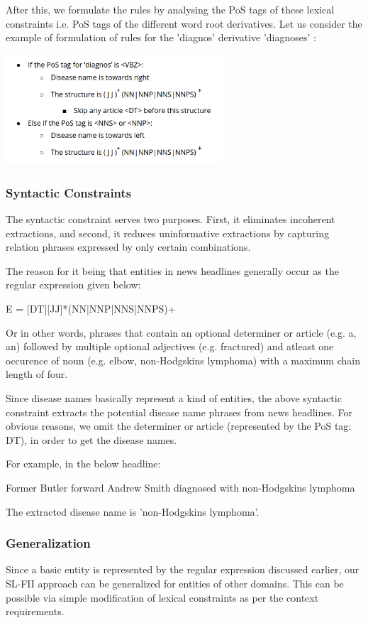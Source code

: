 \documentclass{article}
\begin{document}
After this, we formulate the rules by analysing the PoS tags of these lexical constraints i.e. PoS tags of the
different word root derivatives. Let us consider the example of formulation of rules for the
'diagnos' derivative 'diagnoses' :


\includegraphics[width=3.2in]{img/rules.png}

\subsubsection{Syntactic Constraints}

The syntactic constraint serves two purposes. First, it eliminates incoherent extractions, and second, it
reduces uninformative extractions by capturing relation phrases
expressed by only certain combinations. 

The reason for it being that entities in news headlines generally occur as the regular expression given below:

E = [DT][JJ]*(NN|NNP|NNS|NNPS)+

Or in other words, phrases that contain an optional determiner or article (e.g. a, an)  followed by multiple optional adjectives (e.g. fractured) and atleast one occurence of noun (e.g. elbow, non-Hodgskins lymphoma) with a maximum chain length of four. 
 
Since disease names basically represent a kind of entities, the above syntactic constraint extracts the potential disease name phrases from news headlines. For obvious reasons, we omit the determiner or article (represented by the PoS tag: DT), in order to get the disease names.

For example, in the below headline: 

Former Butler forward Andrew Smith diagnosed with non-Hodgskins lymphoma 

The extracted disease name is 'non-Hodgskins lymphoma'.


\subsubsection{Generalization}
Since a basic entity is represented by the regular expression discussed earlier, our SL-FII approach can be generalized for entities of other domains. This can be possible via simple modification of lexical constraints as per the context requirements. 
\end{document}
